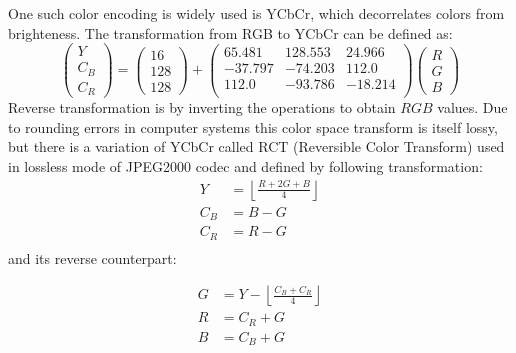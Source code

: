 One such color encoding is widely used is YCbCr, which decorrelates colors    
from brighteness. The transformation from RGB to YCbCr can be defined as:
\[
    \begin{pmatrix}
        Y \\
        C_B \\
        C_R
    \end{pmatrix} = 
    \begin{pmatrix}
        16 \\ 128 \\ 128
    \end{pmatrix}
    +
    \begin{pmatrix}
        65.481 & 128.553 & 24.966 \\
        -37.797 & -74.203 & 112.0 \\
        112.0 & -93.786 & -18.214 \\
    \end{pmatrix}
    \begin{pmatrix}
        R \\ G \\ B
    \end{pmatrix}
\]
Reverse transformation is by inverting the operations to obtain $RGB$ values. Due to rounding errors in 
computer systems this color space transform is itself lossy, but there is a variation of YCbCr called RCT (Reversible Color Transform)
used in lossless mode of JPEG2000 codec and defined by following transformation:
\begin{align*}
    Y &= \left\lfloor\frac{R + 2G + B}{4}\right\rfloor\\
    C_B &= B - G\\
    C_R &= R-G\\ 
\end{align*}
and its reverse counterpart:

\begin{align*}
    G &= Y - \left\lfloor \frac{C_B + C_R}{4} \right\rfloor\\ 
    R &= C_R + G\\
    B &= C_B + G\\
\end{align*}




